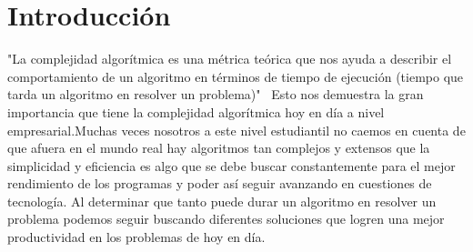 \section{Introducción}
"La complejidad algorítmica es una métrica teórica que nos ayuda a describir el comportamiento de un algoritmo en términos de tiempo de ejecución (tiempo que tarda un algoritmo en resolver un problema)"~\cite{complealg} Esto nos demuestra la gran importancia que tiene la complejidad algorítmica hoy en día a nivel empresarial.Muchas veces nosotros a este nivel estudiantil no caemos en cuenta de que afuera en el mundo real hay algoritmos tan complejos y extensos que la simplicidad y eficiencia es algo que se debe buscar constantemente para el mejor rendimiento de los programas y poder así seguir avanzando en cuestiones de tecnología. Al determinar que tanto puede durar un algoritmo en resolver un problema podemos seguir buscando diferentes soluciones que logren una mejor productividad en los problemas de hoy en día.